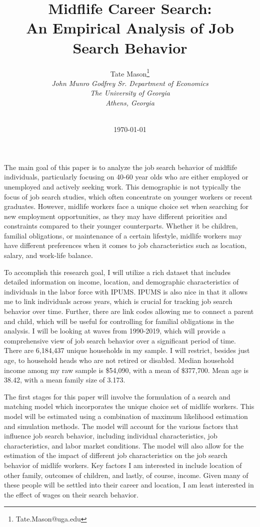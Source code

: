 \documentclass[11pt,a4paper]{article}
\title{Midflife Career Search: \\
An Empirical Analysis of Job Search Behavior}
\author{
    Tate Mason\thanks{Tate.Mason@uga.edu} \\
    \textit{John Munro Godfrey Sr. Department of Economics} \\
    \textit{The University of Georgia} \\
    \textit{Athens, Georgia} \\
    \\
}
\date{\today}
\begin{document}
\maketitle
\thispagestyle{empty}

%

The main goal of this paper is to analyze the job search behavior of midflife individuals, particularly focusing on 40-60 year olds who are either employed or unemployed and actively seeking work.
This demographic is not typically the focus of job search studies, which often concentrate on younger workers or recent graduates. However, midlife workers face a unique choice set
when searching for new employment opportunities, as they may have different priorities and constraints compared to their younger counterparts. Whether it be children, familial obligations,
or maintenance of a certain lifestyle, midlife workers may have different preferences when it comes to job characteristics such as location, salary, and work-life balance.

To accomplish this research goal, I will utilize a rich dataset that includes detailed information on income, location, and demographic characteristics of individuals in the labor force with IPUMS.
IPUMS is also nice in that it allows me to link individuals across years, which is crucial for tracking job search behavior over time. Further, there are link codes allowing me to connect a parent and 
child, which will be useful for controlling for familial obligations in the analysis. I will be looking at waves from 1990-2019, which will provide a comprehensive view of job search behavior over a 
significant period of time. There are 6,184,437 unique households in my sample. I will restrict, besides just age, to household heads who are not retired or disabled. Median household income among my 
raw sample is \$54,090, with a mean of \$377,700. Mean age is 38.42, with a mean family size of 3.173. 

The first stages for this paper will involve the formulation of a search and matching model which incorporates the unique choice set of midlife workers. This model will be estimated using a combination of maximum likelihood estimation and simulation methods. The model will account for
the various factors that influence job search behavior, including individual characteristics, job characteristics, and labor market conditions. The model will also allow for the estimation of the impact of different job characteristics on the job search behavior of midlife workers. Key factors
I am interested in include location of other family, outcomes of children, and lastly, of course, income. Given many of these people will be settled into their career and location, I am least interested in the effect of wages on their search behavior.
\end{document}
